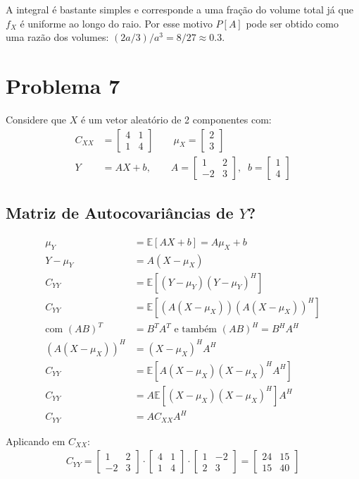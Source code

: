 \documentclass{article}
\begin{document}
A integral é bastante simples e corresponde a uma fração do volume total já que $f_X$ é uniforme ao
longo do raio. Por esse motivo $P[A]$ pode ser obtido como uma razão dos volumes: $(2a/3)/a^3 = 8/27 \approx 0.3$.

\section{Problema 7}
Considere que $X$ é um vetor aleatório de 2 componentes com:
\begin{align*}
    C_{XX} &= \begin{bmatrix} 4 & 1\\1 & 4 \end{bmatrix} \qquad \mu_X = \begin{bmatrix} 2\\3 \end{bmatrix} \\
    Y &= AX + b, \qquad A = \begin{bmatrix} 1 & 2\\-2 & 3 \end{bmatrix}, \;\; b = \begin{bmatrix} 1\\4 \end{bmatrix}
\end{align*}

\subsection{Matriz de Autocovariâncias de $Y$?}
\begin{align*}
    \mu_Y &= \mathbb{E}[AX + b] = A\mu_X + b \\
    Y - \mu_Y &= A(X -\mu_X) \\
    C_{YY} &= \mathbb{E}[(Y-\mu_Y)(Y-\mu_Y)^H] \\
    C_{YY} &= \mathbb{E}[(A(X-\mu_X))(A(X-\mu_X))^H] \\
    \text{com } (AB)^T &= B^TA^T \text{ e também } (AB)^H = B^HA^H \\
    (A(X-\mu_X))^H &= (X-\mu_X)^HA^H \\
    C_{YY} &= \mathbb{E}[A(X-\mu_X)(X-\mu_X)^HA^H] \\
    C_{YY} &= A\mathbb{E}[(X-\mu_X)(X-\mu_X)^H]A^H \\
    C_{YY} &= A C_{XX} A^H
\end{align*}

Aplicando em $C_{XX}$:
\begin{align*}
    C_{YY} = \begin{bmatrix} 1&2\\-2&3 \end{bmatrix} \cdot
    \begin{bmatrix} 4&1\\1&4 \end{bmatrix} \cdot
    \begin{bmatrix} 1&-2\\2&3 \end{bmatrix} =
    \begin{bmatrix} 24&15\\15&40 \end{bmatrix}
\end{align*}
\end{document}
